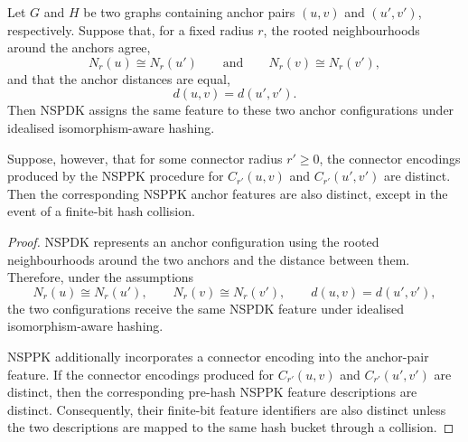\begin{proposition}
\label{prop:nsppk_separates_nspdk}
Let $G$ and $H$ be two graphs containing anchor pairs $(u,v)$ and $(u',v')$,
respectively. Suppose that, for a fixed radius $r$, the rooted neighbourhoods
around the anchors agree,
\[
N_r(u)\cong N_r(u')
\qquad\text{and}\qquad
N_r(v)\cong N_r(v'),
\]
and that the anchor distances are equal,
\[
d(u,v)=d(u',v').
\]
Then NSPDK assigns the same feature to these two anchor configurations under
idealised isomorphism-aware hashing.

Suppose, however, that for some connector radius $r'\geq 0$, the connector
encodings produced by the NSPPK procedure for $C_{r'}(u,v)$ and
$C_{r'}(u',v')$ are distinct. Then the corresponding NSPPK anchor features are
also distinct, except in the event of a finite-bit hash collision.
\end{proposition}





\begin{proof}
NSPDK represents an anchor configuration using the rooted neighbourhoods around
the two anchors and the distance between them. Therefore, under the assumptions
\[
N_r(u)\cong N_r(u'),
\qquad
N_r(v)\cong N_r(v'),
\qquad
d(u,v)=d(u',v'),
\]
the two configurations receive the same NSPDK feature under idealised
isomorphism-aware hashing.

NSPPK additionally incorporates a connector encoding into the anchor-pair
feature. If the connector encodings produced for $C_{r'}(u,v)$ and
$C_{r'}(u',v')$ are distinct, then the corresponding pre-hash NSPPK feature
descriptions are distinct. Consequently, their finite-bit feature identifiers
are also distinct unless the two descriptions are mapped to the same hash
bucket through a collision.
\end{proof}

